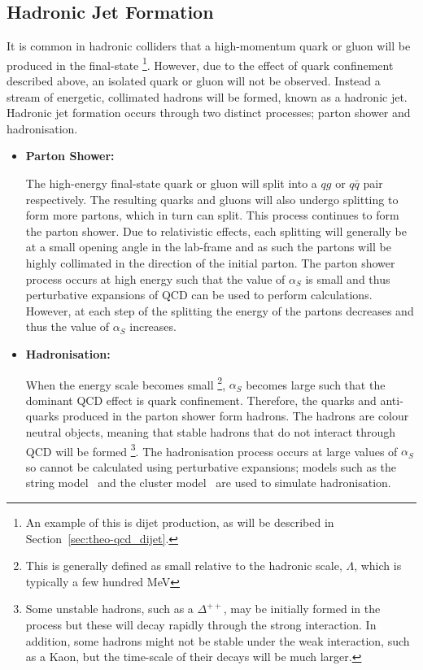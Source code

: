\subsection{Hadronic Jet Formation}
\label{sec:theo-qcd_jets}

It is common in hadronic colliders that a high-momentum quark or gluon will be produced in the final-state
\footnote{An example of this is dijet production, as will be described in Section~\ref{sec:theo-qcd_dijet}.}.
However, due to the effect of quark confinement described above, an isolated quark or gluon will not be observed.
Instead a stream of energetic, collimated hadrons will be formed, known as a hadronic jet.
Hadronic jet formation occurs through two distinct processes; parton shower and hadronisation.

\begin{itemize}[leftmargin=*]
  
\item\textbf{Parton Shower:}

  The high-energy final-state quark or gluon will split into a $qg$ or $q\bar{q}$ pair respectively.
  The resulting quarks and gluons will also undergo splitting to form more partons,
  which in turn can split. This process continues to form the parton shower.
  Due to relativistic effects, each splitting will generally be at a small opening angle in the lab-frame
  and as such the partons will be highly collimated in the direction of the initial parton.
  The parton shower process occurs at high energy such that the value of $\alpha_S$ is small
  and thus perturbative expansions of QCD can be used to perform calculations.
  However, at each step of the splitting the energy of the partons decreases
  and thus the value of $\alpha_S$ increases.\vspace{0.5em}
  
\item\textbf{Hadronisation:}
  
  When the energy scale becomes small
  \footnote{This is generally defined as small relative to the hadronic scale, $\Lambda$, which is typically a few hundred MeV},
  $\alpha_S$ becomes large such that the dominant QCD effect is quark confinement.
  Therefore, the quarks and anti-quarks produced in the parton shower form hadrons.
  The hadrons are colour neutral objects, meaning that stable hadrons that do not interact through QCD will be formed
  \footnote{Some unstable hadrons, such as a $\Delta^{++}$, may be initially formed in the process but these will decay rapidly through the strong interaction.
    In addition, some hadrons might not be stable under the weak interaction, such as a Kaon, but the time-scale of their decays will be much larger.}.
  The hadronisation process occurs at large values of $\alpha_S$ so cannot be calculated using perturbative expansions;
  models such as the string model~\cite{theo-qcd_jet_string} and the
  cluster model~\cite{theo-qcd_jet_cluster} are used to simulate hadronisation.

\end{itemize}
  
